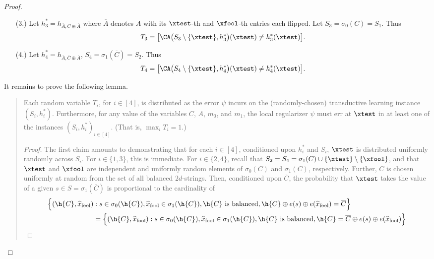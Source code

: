 \begin{proof}
\begin{itemize}
    \item[(3.)] Let $h^*_3 = h_{\overline{A}, C \oplus \overline{A}}$ where $\overline{A}$ denotes $A$ with its $\xtest$-th and $\xfool$-th entries each flipped. Let $S_3 = \sigma_0(C) = S_1$. Thus 
    \[ T_3 = \big[\CA\big(S_3 \setminus \{\xtest\}, h^*_3\big)(\xtest) \neq h^*_3(\xtest) \big]. \]  
    
    \item[(4.)] Let $h^*_4 = h_{\overline{A}, \overline{C} \oplus \overline{A}}$, $S_4 = \sigma_1(\overline{C}) = S_2$. Thus 
    \[ T_4 = \big[\CA\big(S_4 \setminus \{\xtest\}, h^*_4\big)(\xtest) \neq h^*_4(\xtest) \big]. \]  
\end{itemize}

\noindent It remains to prove the following lemma. 
\vspace{-0.7 cm}
\begin{quote}
\begin{lemma}\label{Lemma:internal-main-theorem}
Each random variable $T_i$, for $i \in [4]$, is distributed as the  error $\psi$ incurs on the (randomly-chosen) transductive learning instance $(S_i,h^*_i)$. Furthermore, for any value of the variables $C$, $A$, $m_0$, and $m_1$, the local regularizer $\psi$ must err at $\xtest$ in at least one of the instances $(S_i,h^*_i)_{i \in [4]}$. (That is, $\max_i T_i = 1$.)   
\end{lemma}
\begin{proof}
The first claim amounts to demonstrating that for each $i \in [4]$, conditioned upon $h^*_i$ and $S_i$, $\xtest$ is distributed uniformly randomly across $S_i$. For $i \in \{1, 3\}$, this is immediate. For $i \in \{2, 4\}$, recall that $S_2 = S_4 = \sigma_1(C) \cup \{\xtest\} \setminus \{\xfool\}$, and that $\xtest$ and $\xfool$ are independent and uniformly random elements of $\sigma_0(C)$ and $\sigma_1(C)$, respectively. Further, $C$ is chosen uniformly at random from the set of all balanced $2d$-strings. 
Then, conditioned upon $\overline{C}$, the probability that $\xtest$ takes the value of a given $s \in S = \sigma_1(\overline{C})$ is proportional to the cardinality of 
\begin{align*}
\Big\{ (\h{C}, \widehat{x}_{\mathrm{fool}}) &: s \in \sigma_0(\h{C}), \widehat{x}_{\mathrm{fool}} \in \sigma_1(\h{C}), \h{C} \text{ is balanced}, \h{C} \oplus e(s) \oplus e(\widehat{x}_{\mathrm{fool}}) = \overline{C} \Big\} \\
&= \Big\{ (\h{C}, \widehat{x}_{\mathrm{fool}}) : s \in \sigma_0(\h{C}), \widehat{x}_{\mathrm{fool}} \in \sigma_1(\h{C}), \h{C} \text{ is balanced}, \h{C} = \overline{C} \oplus e(s) \oplus e(\widehat{x}_{\mathrm{fool}}) \Big\}  \\

\end{align*}
\end{proof}
\end{quote}
\end{proof}
